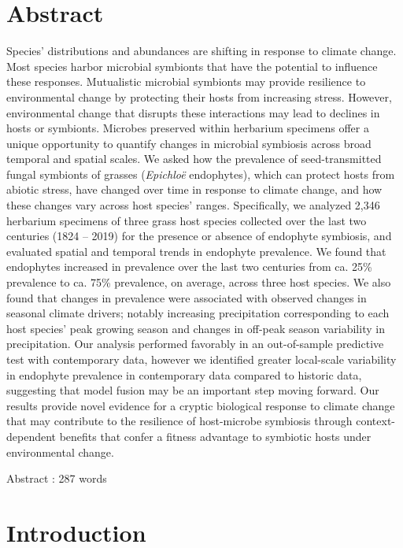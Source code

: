 \documentclass[11pt]{article}
\begin{document}
	\section*{Abstract}
Species' distributions and abundances are shifting in response to climate change. 
Most species harbor microbial symbionts that have the potential to influence these responses.
Mutualistic microbial symbionts may provide resilience to environmental change by protecting their hosts from increasing stress. 
However, environmental change that disrupts these interactions may lead to declines in hosts or symbionts. 
Microbes preserved within herbarium specimens offer a unique opportunity to quantify changes in microbial symbiosis across broad temporal and spatial scales. 
We asked how the prevalence of seed-transmitted fungal symbionts of grasses (\emph{Epichloë} endophytes), which can protect hosts from abiotic stress, have changed over time in response to climate change, and how these changes vary across host species' ranges.
Specifically, we analyzed 2,346 herbarium specimens of three grass host species collected over the last two centuries (1824 -- 2019) for the presence or absence of endophyte symbiosis, and evaluated spatial and temporal trends in endophyte prevalence. 
We found that endophytes increased in prevalence over the last two centuries from ca. 25\% prevalence to ca. 75\% prevalence, on average, across three host species.
We also found that changes in prevalence were associated with observed changes in seasonal climate drivers; notably increasing precipitation corresponding to each host species' peak growing season and changes in off-peak season variability in precipitation. 
Our analysis performed favorably in an out-of-sample predictive test with contemporary data, however we identified greater local-scale variability in endophyte prevalence in contemporary data compared to historic data, suggesting that model fusion may be an important step moving forward.
Our results provide novel evidence for a cryptic biological response to climate change that may contribute to the resilience of host-microbe symbiosis through context-dependent benefits that confer a fitness advantage to symbiotic hosts under environmental change. 

Abstract : 287 words
	
	\newpage{}
	
	\section*{Introduction}
	
\end{document}
